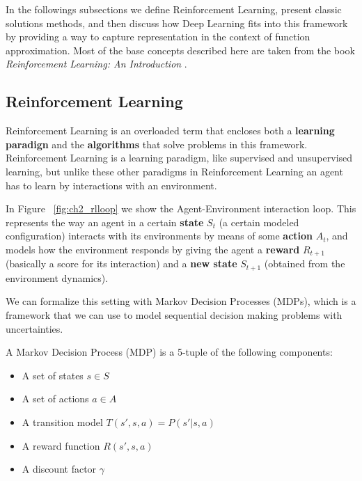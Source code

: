 \figdrlsamplesFirst

\figdrlsamplesSecond

\figdrlsamplesThird

In the followings subsections we define Reinforcement Learning, present classic 
solutions methods, and then discuss how Deep Learning fits into this framework 
by providing a way to capture representation in the context of function approximation.
Most of the base concepts described here are taken from the book \textit{Reinforcement
Learning: An Introduction} \citep{RLbook}.

\subsection{Reinforcement Learning}

Reinforcement Learning is an overloaded term that encloses both a \textbf{learning paradign}
and the \textbf{algorithms} that solve problems in this framework. Reinforcement Learning
is a learning paradigm, like supervised and unsupervised learning, but unlike these other paradigms
in Reinforcement Learning an agent has to learn by interactions with an environment.

In Figure ~\ref{fig:ch2_rlloop} we show the Agent-Environment interaction loop. This represents
the way an agent in a certain \textbf{state} $S_{t}$ (a certain modeled configuration) interacts 
with its environments by means of some \textbf{action} $A_{t}$, and models how the environment 
responds by giving the agent a \textbf{reward} $R_{t+1}$ (basically a score for its interaction) 
and a \textbf{new state} $S_{t+1}$ (obtained from the environment dynamics).

\figrlloop

We can formalize this setting with Markov Decision Processes (MDPs), which is a framework
that we can use to model sequential decision making problems with uncertainties.

\begin{definition}
    A Markov Decision Process (MDP) is a 5-tuple of the following components:
    \begin{itemize}
        \item A set of states $s \in S$
        \item A set of actions $a \in A$
        \item A transition model $T(s',s,a) = P(s'|s,a)$
        \item A reward function $R(s',s,a)$
        \item A discount factor $\gamma$
    \end{itemize}
\end{definition}

